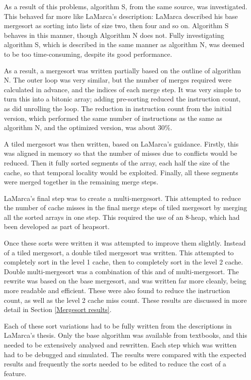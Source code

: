 As a result of this problems, algorithm S, from the same source, was
investigated. This behaved far more like LaMarca's description: LaMarca
described his base mergesort as sorting into lists of size two, then four and
so on. Algorithm S behaves in this manner, though Algorithm N does not. Fully
investigating algorithm S, which is described in the same manner as algorithm N,
was deemed to be too time-consuming, despite its good performance.

As a result, a mergesort was written partially based on the outline of algorithm
N. The outer loop was very similar, but the number of merges required were
calculated in advance, and the indices of each merge step.  It was very simple
to turn this into a bitonic array; adding pre-sorting reduced the instruction
count, as did unrolling the loop. The reduction in instruction count from the
initial version, which performed the same number of instructions as the same as
algorithm N, and the optimized version, was about 30\%.

A tiled mergesort was then written, based on LaMarca's guidance. Firstly, this
was aligned in memory so that the number of misses due to conflicts would be
reduced.  Then it fully sorted segments of the array, each half the size of the
cache, so that temporal locality would be exploited. Finally, all these segments
were merged together in the remaining merge steps.

LaMarca's final step was to create a multi-mergesort. This attempted to reduce
the number of cache misses in the final merge steps of tiled mergesort by
merging all the sorted arrays in one step. This required the use of an 8-heap,
which had been developed as part of heapsort.

Once these sorts were written it was attempted to improve them slightly.
Instead of a tiled mergesort, a double tiled mergesort was written.  This
attempted to completely sort in the level 1 cache, then to completely sort in
the level 2 cache. Double multi-mergesort was a combination of this and of
multi-mergesort. The rewrite was based on the base mergesort, and was written
far more cleanly, being more readable and efficient. These were also found to
reduce the instruction count, as well as the level 2 cache miss count. These
results are discussed in more detail in Section \ref{Mergesort results}.

Each of these sort variations had to be fully written from the descriptions in
LaMarca's thesis. Only the base algorithm was available from textbooks, and this
needed to be extensively analysed and rewritten. Each step which was written had
to be debugged and simulated. The results were compared with the expected
results and frequently the sorts needed to be edited to reduce the cost of a
feature.

